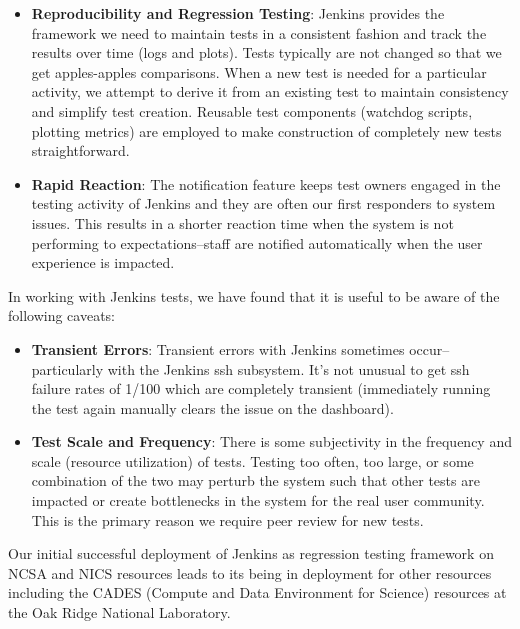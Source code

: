 \documentclass[AMA]{WileyNJD-v1}
\begin{document}
\begin{itemize}
 
\item \textbf{Reproducibility and Regression Testing}: Jenkins provides the framework we need to maintain tests in a consistent fashion and track the results over time (logs and plots). 
Tests typically are not changed so that we get apples-apples comparisons.
When a new test is needed for a particular activity, we attempt to derive it from an existing test to maintain consistency and simplify test creation.
Reusable test components (watchdog scripts, plotting metrics) are employed to make construction of completely new tests straightforward.

\item \textbf{Rapid Reaction}:
The notification feature keeps test owners engaged in the testing activity of Jenkins and they are often our first responders to system issues.  This results in a shorter reaction time when the system is not performing to expectations--staff are notified automatically when the user experience is impacted.

\end{itemize}

In working with Jenkins tests, we have found that it is useful to be aware of the following caveats: 

\begin{itemize}

\item \textbf{Transient Errors}: Transient errors with Jenkins sometimes occur--particularly with the Jenkins ssh subsystem. 
It's not unusual to get ssh failure rates of 1/100 which are completely transient (immediately running the test again manually clears the issue on the dashboard).

\item \textbf{Test Scale and Frequency}: There is some subjectivity in the frequency and scale (resource utilization) of tests.
Testing too often, too large, or some combination of the two may perturb the system such that other tests are impacted or create bottlenecks in the system for the real user community.
This is the primary reason we require peer review for new tests.
\end{itemize}

Our initial successful deployment of Jenkins as regression testing framework on NCSA and NICS resources leads to its being in deployment for other resources including the CADES (Compute and Data Environment for Science) resources at the Oak Ridge National Laboratory. 
\end{document}
